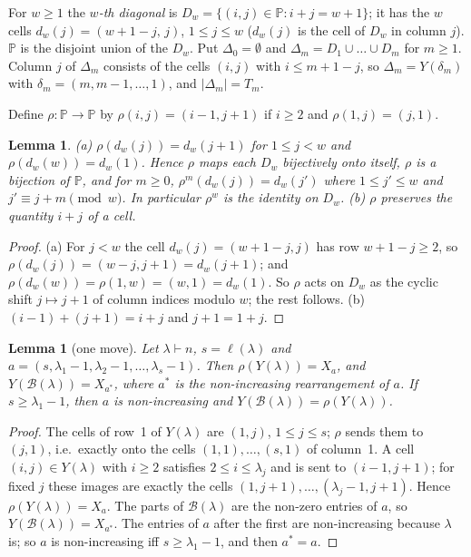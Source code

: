 \documentclass[11pt]{article}
\newtheorem{lemma}[theorem]{Lemma}
\theoremstyle{definition}
\newcommand{\PP}{\mathbb{P}}
\newcommand{\B}{\mathcal{B}}
\renewcommand{\le}{\leqslant}
\renewcommand{\ge}{\geqslant}
\begin{document}
For $w\ge 1$ the \emph{$w$-th diagonal} is $D_w=\{(i,j)\in\PP: i+j=w+1\}$; it has the $w$ cells
$d_w(j)=(w+1-j,\,j)$, $1\le j\le w$ ($d_w(j)$ is the cell of $D_w$ in column $j$).
$\PP$ is the disjoint union of the $D_w$.  Put $\Delta_0=\emptyset$ and
$\Delta_m=D_1\cup\dots\cup D_m$ for $m\ge 1$.  Column $j$ of $\Delta_m$ consists of the cells $(i,j)$ with
$i\le m+1-j$, so $\Delta_m=Y(\delta_m)$ with $\delta_m=(m,m-1,\dots,1)$, and $|\Delta_m|=T_m$.

Define $\rho:\PP\to\PP$ by $\rho(i,j)=(i-1,j+1)$ if $i\ge2$ and $\rho(1,j)=(j,1)$.

\begin{lemma}\label{lem:rho}
(a) $\rho(d_w(j))=d_w(j+1)$ for $1\le j<w$ and $\rho(d_w(w))=d_w(1)$.  Hence $\rho$ maps each $D_w$
bijectively onto itself, $\rho$ is a bijection of $\PP$, and for $m\ge 0$,
$\rho^m(d_w(j))=d_w(j')$ where $1\le j'\le w$ and $j'\equiv j+m\pmod w$.  In particular $\rho^w$ is the
identity on $D_w$.
(b) $\rho$ preserves the quantity $i+j$ of a cell.
\end{lemma}
\begin{proof}
(a) For $j<w$ the cell $d_w(j)=(w+1-j,j)$ has row $w+1-j\ge2$, so $\rho(d_w(j))=(w-j,j+1)=d_w(j+1)$;
and $\rho(d_w(w))=\rho(1,w)=(w,1)=d_w(1)$.  So $\rho$ acts on $D_w$ as the cyclic shift $j\mapsto j+1$
of column indices modulo $w$; the rest follows.  (b) $(i-1)+(j+1)=i+j$ and $j+1=1+j$.
\end{proof}

\begin{lemma}[one move]\label{lem:move}
Let $\lambda\vdash n$, $s=\ell(\lambda)$ and $a=(s,\lambda_1-1,\lambda_2-1,\dots,\lambda_s-1)$.
Then $\rho(Y(\lambda))=X_a$, and $Y(\B(\lambda))=X_{a^*}$, where $a^*$ is the non-increasing rearrangement
of $a$.  If $s\ge\lambda_1-1$, then $a$ is non-increasing and $Y(\B(\lambda))=\rho(Y(\lambda))$.
\end{lemma}
\begin{proof}
The cells of row~1 of $Y(\lambda)$ are $(1,j)$, $1\le j\le s$; $\rho$ sends them to $(j,1)$, i.e.\ exactly
onto the cells $(1,1),\dots,(s,1)$ of column~1.  A cell $(i,j)\in Y(\lambda)$ with $i\ge 2$ satisfies
$2\le i\le\lambda_j$ and is sent to $(i-1,j+1)$; for fixed $j$ these images are exactly the cells
$(1,j+1),\dots,(\lambda_j-1,j+1)$.  Hence $\rho(Y(\lambda))=X_a$.  The parts of $\B(\lambda)$ are the non-zero
entries of $a$, so $Y(\B(\lambda))=X_{a^*}$.  The entries of $a$ after the first are non-increasing because
$\lambda$ is; so $a$ is non-increasing iff $s\ge\lambda_1-1$, and then $a^*=a$.
\end{proof}
\end{document}
